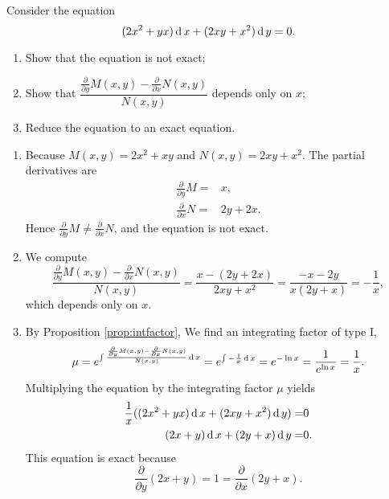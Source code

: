\begin{example} 
	Consider the equation
	\[ (2x^2+yx )  \operatorname{d} x +  (2xy+ x^2 )\operatorname{d} y  =0. \]
	\begin{enumerate}
		\item  Show that the equation is not exact;
		\item Show that $\dfrac{\frac{\partial}{\partial y} M(x,y) - \frac{\partial}{\partial x} N(x,y)}{N(x,y)}$ depends only on $x$;
		\item Reduce the equation to an exact equation.
	\end{enumerate}
\end{example}
\begin{solution}
    \begin{enumerate}
      \item Because $M(x, y)= 2x^2 + xy$ and $N(x, y) = 2xy+x^2$. The partial derivatives are
      \[
      \begin{split}
      \frac{\partial}{\partial y} M = & x, \\
      \frac{\partial}{\partial x} N = &  2y+2x. 
      \end{split}
      \]
      Hence $\frac{\partial}{\partial y} M \neq \frac{\partial}{\partial x} N$, and
      the equation is not exact.
      \item 
      We compute
      \[
      \frac{\frac{\partial}{\partial y} M(x,y) - \frac{\partial}{\partial x} N(x,y)}{N(x,y)} = \frac{x -(2y+2x)}{2xy+x^2} = \frac{-x-2y}{x(2y+x)} = -\frac{1}{x},
      \]
      which depends only on $x$.
      \item By Proposition \ref{prop:intfactor}, 
      We find an integrating factor of type I, 
      \[
      \mu = e^{\int \frac{\frac{\partial}{\partial y} M(x,y) - \frac{\partial}{\partial x} N(x,y)}{N(x,y)} \operatorname{d} x}= e^{\int - \frac{1}{x}\operatorname{d} x} =e^{-\ln x } = \frac{1}{e^{\ln x}}=\frac{1}{x}.
      \]
        Multiplying the equation by the integrating factor $\mu$ yields
      \[ 
      \begin{aligned}
        \frac{1}{x} ((2x^2+yx )  \operatorname{d} x+ (2xy+ x^2 ) \operatorname{d} y ) =& 0 \\
        (2x+y)  \operatorname{d} x +  (2y+ x ) \operatorname{d} y =& 0. 
      \end{aligned}
      \]
      This equation is exact because
      \[\frac{\partial}{\partial y}(2x+y)=1=\frac{\partial}{\partial x}(2y+x).\]
    \end{enumerate}
\end{solution}

